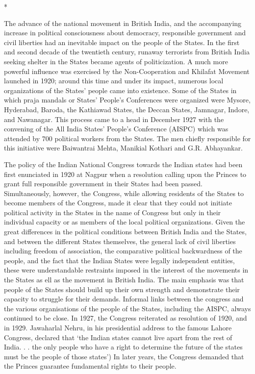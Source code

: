 \begin{center}*\end{center}



The advance of the national movement in British India, and the accompanying increase in political consciousness about democracy, responsible government and civil liberties had an inevitable impact on the people of the States. In the first and second decade of the twentieth century, runaway terrorists from British India seeking shelter in the States became agents of politicization. A much more powerful influence was exercised by the Non-Cooperation and Khilafat Movement launched in 1920; around this time and under its impact, numerous local organizations of the States’ people came into existence. Some of the States in which praja mandals or States’ People’s Conferences were organized were Mysore, Hyderabad, Baroda, the Kathiawad States, the Deccan States, Jamnagar, Indore, and Nawanagar. This process came to a head in December 1927 with the convening of the All India States’ People’s Conference (AISPC) which was attended by 700 political workers from the States. The men chiefly responsible for this initiative were Baiwantrai Mehta, Manikial Kothari and G.R. Abhayankar. 

The policy of the Indian National Congress towards the Indian states had been first enunciated in 1920 at Nagpur when a resolution calling upon the Princes to grant full responsible government in their States had been passed. Simultaneously, however, the Congress, while allowing residents of the States to become members of the Congress, made it clear that they could not initiate political activity in the States in the name of Congress but only in their individual capacity or as members of the local political organizations. Given the great differences in the political conditions between British India and the States, and between the different States themselves, the general lack of civil liberties including freedom of association, the comparative political backwardness of the people, and the fact that the Indian States were legally independent entities, these were understandable restraints imposed in the interest of the movements in the States as ell as the movement in British India. The main emphasis was that people of the States should build up their own strength and demonstrate their capacity to struggle for their demands. Informal links between the congress and the various organisations of the people of the States, including the AISPC, always continued to be close. In 1927, the Congress reiterated as resolution of 1920, and in 1929. Jawaharlal Nehru, in his presidential address to the famous Lahore Congress, declared that ‘the Indian states cannot live apart from the rest of India. . . the only people who have a right to determine the future of the states must be the people of those states’) In later years, the Congress demanded that the Princes guarantee fundamental rights to their people. 

